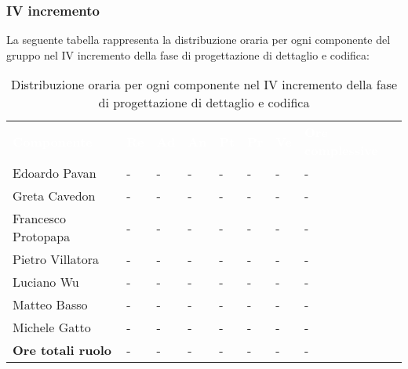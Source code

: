 \subsubsection{IV incremento}
La seguente tabella rappresenta la distribuzione oraria per ogni componente del gruppo nel IV incremento della fase di progettazione di dettaglio e codifica:
\begin{table}[!htbp]
\begin{center}
\renewcommand{\arraystretch}{1.25}
\begin{tabular}{ m{}<{\centering}  m{}<{\centering} m{}<{\centering} m{}<{\centering}  m{}<{\centering}  m{}<{\centering}  m{}<{\centering}  m{}<{\centering}   }
	\rowcolor{darkblue}
	\textcolor{white}{\textbf{Componente}} &\textcolor{white}{\textbf{Re}}&\textcolor{white}{\textbf{Ad}}&\textcolor{white}{\textbf{An}}&\textcolor{white}{\textbf{Pt}}&\textcolor{white}{\textbf{Pr}}&\textcolor{white}{\textbf{Ve}}&\textcolor{white}{\textbf{Ore complessive}}\\ 

	Edoardo Pavan & - & - & - & - & - & - & -\\	

	\rowcolor{gray!10} Greta Cavedon & - & - & - & - & - & - & -\\
	
	Francesco Protopapa & - & - & - & - & - & - & -\\
	
	\rowcolor{gray!10} Pietro Villatora & - & - & - & - & - & - & -\\
	
	Luciano Wu & - & - & - & - & - & - & -\\
	
	\rowcolor{gray!10} Matteo Basso & - & - & - & - & - & - & -\\
	
	Michele Gatto & - & - & - & - & - & - & -\\
	
	\rowcolor{gray!10} \textbf{Ore totali ruolo} & - & - & - & - & - & - & -\\

\end{tabular}
\caption{Distribuzione oraria per ogni componente nel IV incremento della fase di progettazione di dettaglio e codifica}
\end{center}
\end{table}

